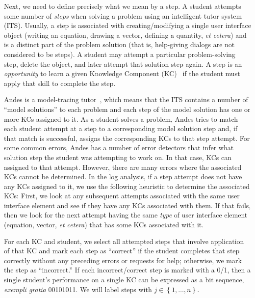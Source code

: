 \documentclass{edm_template}
\begin{document}
Next,  we need to define
precisely what we mean by a step.
A student attempts some number of {\em steps} when solving a problem
using an intelligent tutor system (ITS).
Usually, a step is associated with creating/modifying a single user
interface object (writing an equation, drawing a vector, defining a
quantity, {\em et cetera}) and is a distinct part of the problem
solution (that is, help-giving dialogs are not considered to be
steps).  A student may attempt a particular problem-solving step,
delete the object, and later attempt that solution step again.  A step
is an {\em opportunity} to learn a given Knowledge Component
(KC)~\cite{vanlehn_behavior_2006} if the student must apply that skill
to complete the step.

\label{blame}

Andes is a model-tracing tutor~\cite{anderson_development_1991}, which
means that the ITS contains a number of ``model solutions'' to each
problem and each step of the model solution has one or more KCs
assigned to it.   As a student solves a problem, Andes tries to match
each student attempt at a step to a corresponding model solution step
and, if that match is successful, assigns the corresponding KCs to
that step attempt.  For some common errors, Andes has a number of
error detectors that infer what solution step the student was
attempting to work on.  In that case, KCs can assigned to that
attempt.  However, there are many errors where the associated KCs
cannot be determined.  In the log analysis, if a step attempt does not
have any KCs assigned to it, we use the following 
heuristic to determine the associated KCs:  First, we look at any  subsequent attempts
associated with the same user interface element and see if they have
any KCs associated with them.  If that fails, then we look for the
next attempt having the same {\em type} of user interface element (equation,
vector, {\em et cetera}) that has some KCs associated with it.

%
%

For each KC and student, we select all attempted steps that involve application
of that KC and mark each step as ``correct'' if
the student completes that step correctly without any preceding errors or 
requests for help; otherwise, we mark the step as ``incorrect.''
\label{steps}  %
If each incorrect/correct step is marked with a 0/1, then
a single student's performance on a single KC can be expressed as a bit  sequence,
{\em exempli gratia} 00101011.  We will label
steps with $j\in\left\{1,\ldots,n\right\}$.  
\end{document}
